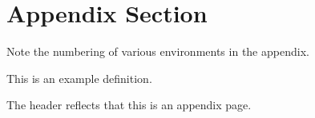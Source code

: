 \section{Appendix Section}%
\label{sec:Appendix Section}

Note the numbering of various environments in the appendix.

\begin{definition}
    This is an example definition.
\end{definition}

\begin{remark}
    The header reflects that this is an appendix page.
\end{remark}
